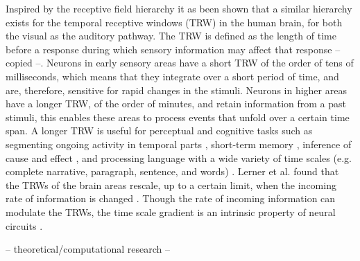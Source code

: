 Inspired by the receptive field hierarchy it as been shown that a similar hierarchy exists for the temporal receptive windows (TRW) in the human brain, for both the visual as the auditory pathway. The  TRW is defined as the length of time before a response during which sensory information may affect that response -- copied --. Neurons in early sensory areas have a short TRW of the order of tens of milliseconds, which means that they integrate over a short period of time, and are, therefore, sensitive for rapid changes in the stimuli. Neurons in higher areas have a longer TRW, of the order of minutes, and retain information from a past stimuli, this enables these areas to process events that unfold over a certain time span\cite{hasson2008hierarchy, lerner2011topographic, honey2012slow}. A longer TRW is useful for perceptual and cognitive tasks such as segmenting ongoing activity in temporal parts \cite{zacks2001human,hasson2008hierarchy}, short-term memory \cite{hasson2015hierarchical, durstewitz2000neurocomputational}, inference of cause and effect \cite{fonlupt2003perception}, and processing language with a wide variety of time scales (e.g. complete narrative, paragraph, sentence, and words) \cite{xu2005language, lerner2011topographic}. Lerner et al. found that the TRWs of the brain areas rescale, up to a certain limit, when the incoming rate of information is changed \cite{lerner2014temporal}. Though the rate of incoming information can modulate the TRWs, the time scale gradient is an intrinsic property of neural circuits \cite{stephens2013place}.

-- theoretical/computational research --


